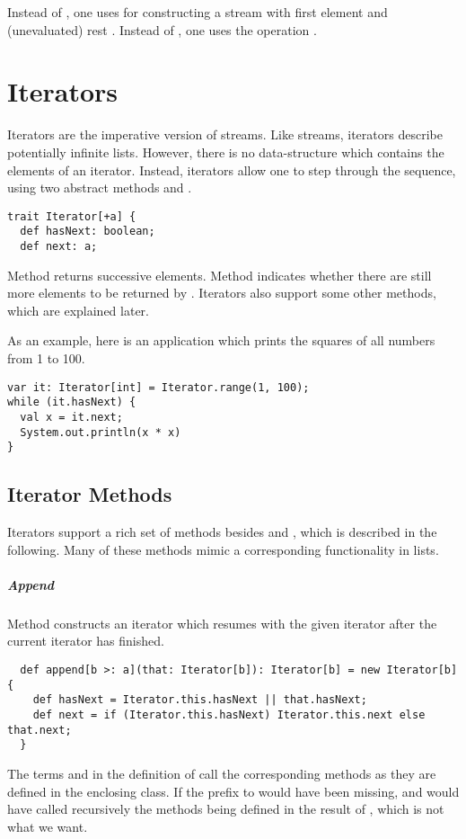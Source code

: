 {Instead of , one uses  for
constructing a stream with first element  and (unevaluated)
rest .  Instead of , one uses the operation
.  

\chapter{Iterators}

Iterators are the imperative version of streams. Like streams,
iterators describe potentially infinite lists. However, there is no
data-structure which contains the elements of an iterator. Instead, 
iterators allow one to step through the sequence, using two abstract methods  and .
\begin{lstlisting}
trait Iterator[+a] {
  def hasNext: boolean;
  def next: a;
\end{lstlisting}
Method  returns successive elements.  Method 
indicates whether there are still more elements to be returned by
. Iterators also support some other methods, which are
explained later.

As an example, here is an application which prints the squares of all
numbers from 1 to 100.
\begin{lstlisting}
var it: Iterator[int] = Iterator.range(1, 100);
while (it.hasNext) {
  val x = it.next;
  System.out.println(x * x)
}
\end{lstlisting}

\section{Iterator Methods}

Iterators support a rich set of methods besides  and
, which is described in the following. Many of these
methods mimic a corresponding functionality in lists.

\paragraph{Append}
Method  constructs an iterator which resumes with the
given iterator  after the current iterator has finished.
\begin{lstlisting}
  def append[b >: a](that: Iterator[b]): Iterator[b] = new Iterator[b] {
    def hasNext = Iterator.this.hasNext || that.hasNext;
    def next = if (Iterator.this.hasNext) Iterator.this.next else that.next;
  }    
\end{lstlisting}
The terms  and 
in the definition of  call the corresponding methods as
they are defined in the enclosing  class.  If the
 prefix to  would have been missing,
 and  would have called recursively the
methods being defined in the result of , which is not
what we want.

}
